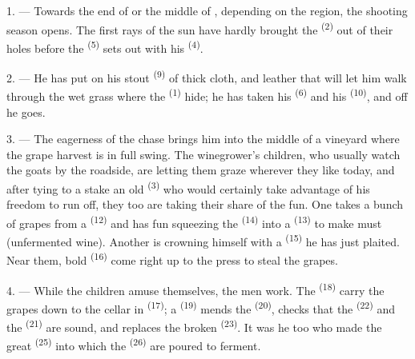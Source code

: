 \VUsaut{6.0mm}
\VUsaut{3.6mm}

\VUsaut{1.4mm}
\VUsaut{4.0mm}

1. --- Towards the end of  or the middle of
, depending on the region, the shooting season opens.
The first rays of the sun have hardly brought the  \textsuperscript{(2)} out
of their holes before the  \textsuperscript{(5)} sets out with his
 \textsuperscript{(4)}.

2. --- He has put on his stout  \textsuperscript{(9)} of thick cloth,
and leather  that will let him walk through the wet grass where the
 \textsuperscript{(1)} hide; he has taken his
 \textsuperscript{(6)} and his  \textsuperscript{(10)}, and
off he goes.

3. --- The eagerness of the chase brings him into the middle of a vineyard where the grape
harvest is in full swing. The winegrower's children, who usually watch the goats by the
roadside, are letting them graze wherever they like today, and after tying to a stake an old
 \textsuperscript{(3)} who would certainly take advantage of his freedom to
run off, they too are taking their share of the fun. One takes a bunch of grapes from a
 \textsuperscript{(12)} and has fun squeezing the 
\textsuperscript{(14)} into a  \textsuperscript{(13)} to make must (unfermented
wine). Another is crowning himself with a  \textsuperscript{(15)} he
has just plaited. Near them, bold  \textsuperscript{(16)} come right up to
the press to steal the grapes.

4. --- While the children amuse themselves, the men work. The
 \textsuperscript{(18)} carry the grapes down to the cellar in
 \textsuperscript{(17)}; a  \textsuperscript{(19)} mends
the  \textsuperscript{(20)}, checks that the 
\textsuperscript{(22)} and the  \textsuperscript{(21)} are sound, and replaces
the broken  \textsuperscript{(23)}. It was he too who made the great
 \textsuperscript{(25)} into which the  \textsuperscript{(26)} are
poured to ferment.


